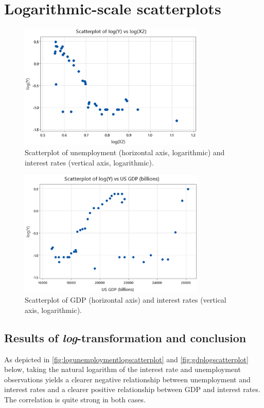 \documentclass[12pt]{article}
\begin{document}
\section{Logarithmic-scale scatterplots}
\begin{figure}[p]
\begin{center}
\includegraphics[width=3.5in]{images/log-unemployment-log-scatterplot.png}
\end{center}
\caption{Scatterplot of unemployment (horizontal axis, logarithmic) and interest rates (vertical axis, logarithmic).\label{fig:logunemploymentlogscatterplot}}
\end{figure}
\begin{figure}[p]
\begin{center}
\includegraphics[width=3.5in]{images/gdp-log-scatterplot.png}
\end{center}
\caption{Scatterplot of GDP (horizontal axis) and interest rates (vertical axis, logarithmic).\label{fig:gdplogscatterplot}}
\end{figure}
\subsection{Results of \emph{log}-transformation and conclusion}
As depicted in \autoref{fig:logunemploymentlogscatterplot} and \autoref{fig:gdplogscatterplot} below, taking the natural logarithm of the interest rate and unemployment observations yields a clearer negative relationship between unemployment and interest rates and a clearer positive relationship between GDP and interest rates. The correlation is quite strong in both cases.
\end{document}
